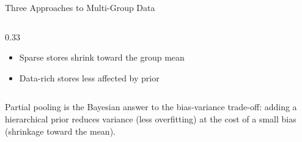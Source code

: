 \documentclass[aspectratio=169, 11pt]{beamer}
\begin{document}
\begin{frame}{Three Approaches to Multi-Group Data}
\begin{columns}[T]
\begin{column}{0.33\textwidth}
{\begin{itemize}
        \item Sparse stores shrink toward the group mean
        \item Data-rich stores less affected by prior
      \end{itemize}}
    \end{column}
  \end{columns}
  \vspace{0.2cm}
  \begin{keybox}
    Partial pooling is the Bayesian answer to the bias-variance trade-off:
    adding a hierarchical prior reduces variance (less overfitting) at the cost
    of a small bias (shrinkage toward the mean).
    \parencite{Gelman2013}
  \end{keybox}
\end{frame}

\end{document}
